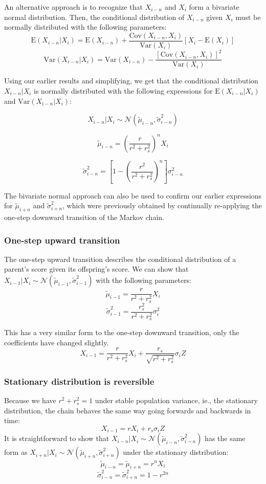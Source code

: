 \documentclass[letterpaper,10pt]{article} %
\begin{document}
An alternative approach is to recognize that $X_{i-n}$ and $X_i$ form a bivariate normal distribution. Then, the conditional distribution of $X_{i-n}$ given $X_i$ must be normally distributed with the following parameters:
$$\mathrm{E}(X_{i-n}|X_i) = \mathrm{E}(X_{i-n}) + \frac{\mathrm{Cov}(X_{i-n}, X_i)}{\mathrm{Var}(X_i)}[X_i - \mathrm{E}(X_i)]$$
$$\mathrm{Var}(X_{i-n}|X_i) = \mathrm{Var}(X_{i-n}) - \frac{[\mathrm{Cov}(X_{i-n}, X_i)]^2}{\mathrm{Var}(X_i)}$$

Using our earlier results and simplifying, we get that the conditional distribution $X_{i-n}|X_i$ is normally distributed with the following expressions for $\mathrm{E}(X_{i-n}|X_i)$ and $\mathrm{Var}(X_{i-n}|X_i)$:

$$X_{i-n}|X_i \sim \mathcal{N}( \tilde{\mu}_{i-n}, \tilde{\sigma}_{i-n}^2)$$

$$\tilde{\mu}_{i-n} = (\frac{r}{r^2+r_s^2})^n X_i$$

$$\tilde{\sigma}_{i-n}^2 = [1 - (\frac{r^2}{r^2+r_s^2})^n] \sigma_{i-n}^2$$

The bivariate normal approach can also be used to confirm our earlier expressions for $\tilde{\mu}_{i+n}$ and $\tilde{\sigma}_{i+n}^2$, which were previously obtained by continually re-applying the one-step downward transition of the Markov chain.

\subsubsection*{One-step upward transition}
The one-step upward transition describes the conditional distribution of a parent's score given its offspring's score. We can show that $X_{i-1}|X_i \sim \mathcal{N}( \tilde{\mu}_{i-1}, \tilde{\sigma}_{i-1}^2)$ with the following parameters:
$$\tilde{\mu}_{i-1} = \frac{r}{r^2+r_s^2} X_i$$
$$\tilde{\sigma}_{i-1}^2 = \frac{r_s^2}{r^2+r_s^2} \sigma_i^2$$

This has a very similar form to the one-step downward transition, only the coefficients have changed slightly.
$$X_{i-1} = \frac{r}{r^2+r_s^2} X_i + \frac{r_s}{\sqrt{r^2+r_s^2}} \sigma_{i} Z$$


\subsubsection*{Stationary distribution is reversible}

Because we have $r^2+r_s^2 = 1$ under stable population variance, ie., the stationary distribution, the chain behaves the same way going forwards and backwards in time:
$$X_{i-1} = r X_i + r_s \sigma_{i} Z$$
It is straightforward to show that $X_{i-n}|X_i \sim \mathcal{N}( \tilde{\mu}_{i-n}, \tilde{\sigma}_{i-n}^2)$ has the same form as $X_{i+n}|X_i \sim \mathcal{N}( \tilde{\mu}_{i+n}, \tilde{\sigma}_{i+n}^2)$ under the stationary distribution:
$$\tilde{\mu}_{i-n} = \tilde{\mu}_{i+n} = r^nX_i$$
$$\tilde{\sigma}_{i-n}^2 = \tilde{\sigma}_{i+n}^2 = 1-r^{2n}$$
\end{document}
